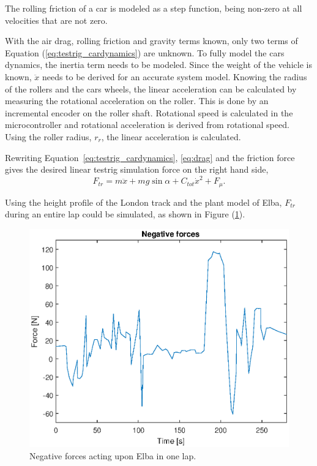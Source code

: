 The rolling friction of a car is modeled as a step function, being non-zero at
all velocities that are not zero.

With the air drag, rolling friction and gravity terms known, only two terms of
Equation (\ref{eq:testrig_cardynamics}) are unknown. To fully model the cars
dynamics, the inertia term needs to be modeled. Since the weight of the vehicle
is known, $\ddot{x}$ needs to be derived for an accurate system model.
Knowing the radius of the rollers and the cars wheels, the linear acceleration
can be calculated by measuring the rotational acceleration on the roller. This
is done by an incremental encoder on the roller shaft. Rotational speed is
calculated in the microcontroller and rotational acceleration is derived from
rotational speed. Using the roller radius, $r_{r}$, the linear acceleration
is calculated.

Rewriting Equation~\ref{eq:testrig_cardynamics}, \ref{eq:drag} and the friction force gives the
desired linear testrig simulation force on the right hand side,
\begin{equation} \label{eq:simulationforce}
    F_{tr} = m\ddot{x} + mg\sin{\alpha} + C_{tot}\dot{x}^2 + F_{\mu}.
\end{equation}

Using the height profile of the London track and the plant model of Elba, $F_{tr}$ during an entire lap could be simulated, as shown in Figure (\ref{fig:testrig_negative_forces}).

\begin{figure}[H]
    \centering
    \includegraphics[width=\textwidth]{./img/testrig_negative_forces.eps}
    \caption{Negative forces acting upon Elba in one lap.}\label{fig:testrig_negative_forces}
\end{figure}


